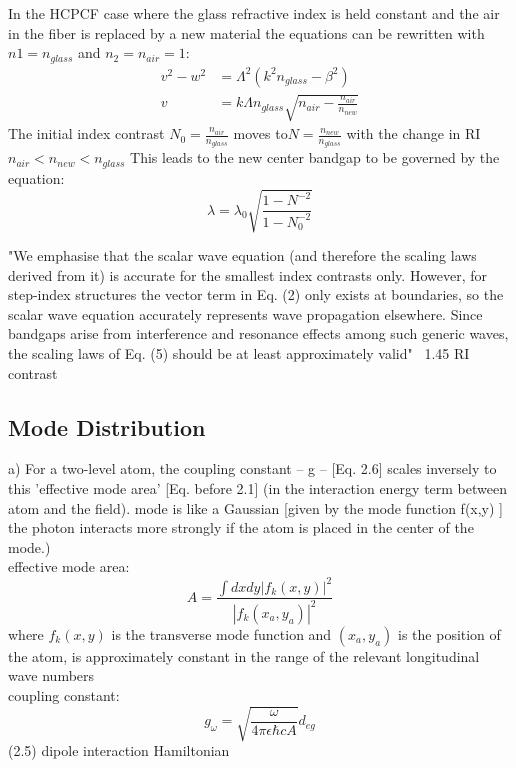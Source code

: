 In the HCPCF case where the glass refractive index is held constant and the air in the fiber is replaced by a new material the equations can be rewritten with $n1 = n_{glass}$ and $n_2 = n_{air}=1$:
\begin{equation}
	\begin{aligned}
		v^2 - w^2 &= \Lambda^2(k^2n_{glass} - \beta^2)\\
		v &= k\Lambda n_{glass}\sqrt{n_{air} - \frac{n_{air}}{n_{new}}}
	\end{aligned}
\end{equation}
The initial index contrast $N_0 = \frac{n_{air}}{n_{glass}}$ moves to$ N = \frac{n_{new}}{n_{glass}}$ with the change in RI $n_{air} <  n_{new} < n_{glass}$
This leads to the new center bandgap to be governed by the equation: 
\begin{equation}
	\lambda = \lambda_0\sqrt{\frac{1-N^{-2}}{1-N_0^{-2}}}
\end{equation}

"We emphasise that the scalar wave equation (and therefore the scaling laws derived from it) is accurate for the smallest index contrasts only. However, for step-index structures the vector term in Eq. (2) only exists at boundaries, so the scalar wave equation accurately represents wave propagation elsewhere. Since bandgaps arise from interference and resonance effects among such generic waves, the scaling laws of Eq. (5) should be at least approximately valid" ~1.45 RI contrast

\subsection{Mode Distribution}
a) For a two-level atom, the coupling constant -- g -- [Eq. 2.6] scales inversely to this 'effective mode area'  [Eq. before 2.1]  (in the interaction energy term between atom and the field).  mode is like a Gaussian [given by the mode function f(x,y) ] the photon interacts more strongly if the atom is placed in the center of the mode.)\\
effective mode area:
\begin{equation}
	A = \frac{\int dxdy|f_k(x, y)|^2}{|f_k(x_a, y_a)|^2}
\end{equation}
where $f_k(x,y)$ is the transverse mode function and $(x_a,y_a )$ is the position of the atom, is approximately constant in the range of the relevant longitudinal wave numbers\\
coupling constant:
\begin{equation}
	g_\omega = \sqrt{\frac{\omega}{4\pi\epsilon\hbar c A}}d_{eg}
\end{equation}
(2.5) dipole interaction Hamiltonian 


